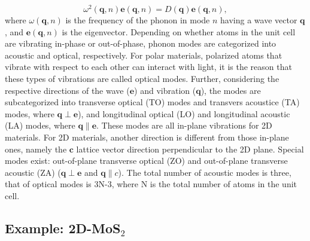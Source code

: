 \begin{equation}\label{eqa:w_q}
\omega^2(\mathbf{q},n)\mathbf{e}(\mathbf{q},n)=D(\mathbf{q})\mathbf{e}(\mathbf{q},n),
\end{equation}
where $\omega(\mathbf{q},n)$ is the frequency of the phonon in mode $n$ having a wave vector $\mathbf{q}$, and $\mathbf{e}(\mathbf{q},n)$ is the eigenvector\cite{Ackland1997,Parlinski2011}.  Depending on whether atoms in the unit cell are vibrating in-phase or out-of-phase, phonon modes are categorized into acoustic and optical, respectively. For polar materials, polarized atoms that vibrate with respect to each other can interact with light, it is the reason that these types of vibrations are called optical modes. Further, considering the respective directions of the wave ($\mathbf{e}$) and vibration ($\mathbf{q}$), the modes are subcategorized into transverse optical (TO) modes and transvers acoustice (TA) modes, where $\mathbf{q} \perp \mathbf{e}$), and longitudinal optical (LO) and longitudinal acoustic (LA) modes, where $\mathbf{q} \parallel \mathbf{e}$. These modes are all in-plane vibrations for 2D materials. For 2D materials, another direction is different from those in-plane ones, namely the $\mathbf{c}$ lattice vector direction perpendicular to the 2D plane. Special modes exist: out-of-plane transverse optical (ZO) and out-of-plane transverse acoustic (ZA) ($\mathbf{q} \perp \mathbf{e}$ and $\mathbf{q} \parallel c$). The total number of acoustic modes is three, that of optical modes is 3N-3, where N is the total number of atoms in the unit cell. 


\subsection{Example: 2D-MoS$_2$}

